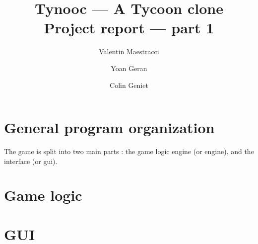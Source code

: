 \documentclass{article}
\begin{document}
\title{Tynooc --- A Tycoon clone \\ \large{Project report --- part 1}}
\author{Valentin Maestracci \and Yoan Geran \and Colin Geniet}
\maketitle

\tableofcontents

\section{General program organization}
The game is split into two main parts : the game logic engine (or engine), and the interface (or gui).


\section{Game logic}

\section{GUI}
\end{document}
